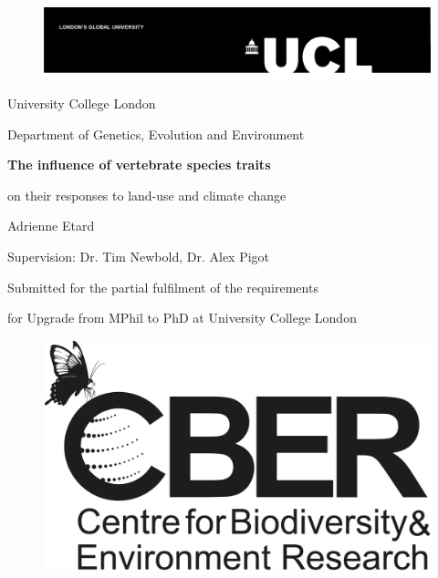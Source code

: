 \date{\today}

\begin{titlepage}

\begin{figure}
{\includegraphics[scale=0.8]{figures/UCL_logo}}
\end{figure}

\begin{center}

{\Large
University College London\par
Department of Genetics, Evolution and Environment\par
}
%
\vskip 4cm
%
{\huge \bf
The influence of vertebrate species traits  \par
on their responses to land-use and climate change\par
}
%
\vskip 2cm
%
{\Large
Adrienne Etard\par
Supervision: Dr. Tim Newbold, Dr. Alex Pigot

\vskip 1cm

\makeatletter
\@date
\vskip 1.5cm
\par
Submitted for the partial fulfilment of the requirements \par 
for Upgrade from MPhil to PhD at University College London
\vskip 1cm
}
\end{center}
\begin{figure}[h!]
\centering
{\includegraphics[scale=0.09]{figures/cber_logo}}
\end{figure}
\end{titlepage}

\makeatother
